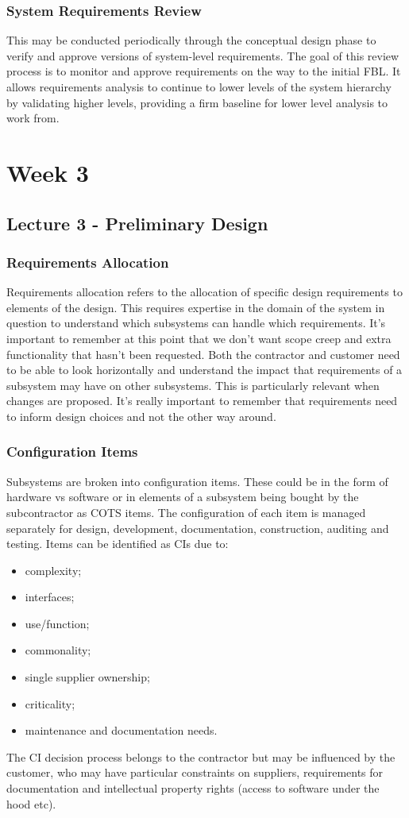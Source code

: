 \documentclass[journal]{IEEEtran}
\begin{document}
\subsubsection{System Requirements Review}
This may be conducted periodically through the conceptual design phase to verify and approve versions of system-level requirements. The goal of this review process is to monitor and approve requirements on the way to the initial FBL. It allows requirements analysis to continue to lower levels of the system hierarchy by validating higher levels, providing a firm baseline for lower level analysis to work from.

\section{Week 3}
\subsection{\textbf{Lecture 3 - Preliminary Design}}
\subsubsection{\textbf{Requirements Allocation}}
Requirements allocation refers to the allocation of specific design requirements to elements of the design. This requires expertise in the domain of the system in question to understand which subsystems can handle which requirements. It's important to remember at this point that we don't want scope creep and extra functionality that hasn't been requested. Both the contractor and customer need to be able to look horizontally and understand the impact that requirements of a subsystem may have on other subsystems. This is particularly relevant when changes are proposed. It's really important to remember that requirements need to inform design choices and not the other way around.
\subsubsection{\textbf{Configuration Items}}
Subsystems are broken into configuration items. These could be in the form of hardware vs software or in elements of a subsystem being bought by the subcontractor as COTS items. The configuration of each item is managed separately for design, development, documentation, construction, auditing and testing. Items can be identified as CIs due to:
\begin{itemize}
	\item complexity;
	\item interfaces;
	\item use/function;
	\item commonality;
	\item single supplier ownership;
	\item criticality;
	\item maintenance and documentation needs.
\end{itemize}
The CI decision process belongs to the contractor but may be influenced by the customer, who may have particular constraints on suppliers, requirements for documentation and intellectual property rights (access to software under the hood etc).
\end{document}
